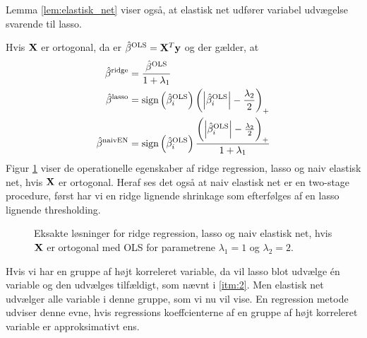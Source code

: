 Lemma \ref{lem:elastisk_net} viser også, at elastisk net udfører variabel udvægelse svarende til lasso.
%
\begin{exmp}
Hvis \(\mathbf{X}\) er ortogonal, da er \(\hat{\beta}^\text{OLS} = \mathbf{X}^T \mathbf{y}\) og der gælder, at
\begin{align*}
\hat{\beta}^\text{ridge} &= \frac{\hat{\beta}^\text{OLS}}{1+\lambda_1} \\
\hat{\beta}^\text{lasso} &= \text{sign} \del{\hat{\beta}_i^\text{OLS}} \del{\left\vert \hat{\beta}_i^\text{OLS} \right\vert - \frac{\lambda_2}{2}}_+ \\
\hat{\beta}^\text{naivEN} &= \text{sign} \del{\hat{\beta}_i^\text{OLS}} \frac{\del{\left\vert \hat{\beta}_i^\text{OLS} \right\vert - \frac{\lambda_2}{2}}_+}{1+\lambda_1}
\end{align*}
Figur \ref{fig:elastisk2} viser de operationelle egenskaber af ridge regression, lasso og naiv elastisk net, hvis \(\mathbf{X}\) er ortogonal. Heraf ses det også at naiv elastisk net er en two-stage procedure, først har vi en ridge lignende shrinkage som efterfølges af en lasso lignende thresholding.
%
\begin{figure}[H]
\centering
\scalebox{0.8}{}
\caption[optional short text]{Eksakte løsninger for  ridge regression,  lasso og  naiv elastisk net, hvis \(\mathbf{X}\) er ortogonal med  OLS for parametrene \(\lambda_1=1\) og \(\lambda_2=2\).} \label{fig:elastisk2}
\end{figure}
%
\end{exmp}
%
Hvis vi har en gruppe af højt korreleret variable, da vil lasso blot udvælge én variable og den udvælges tilfældigt, som nævnt i \ref{itm:2}.
Men elastisk net udvælger alle variable i denne gruppe, som vi nu vil vise. 
En regression metode udviser denne evne, hvis regressions koeffcienterne af en gruppe af højt korreleret variable er approksimativt ens.

